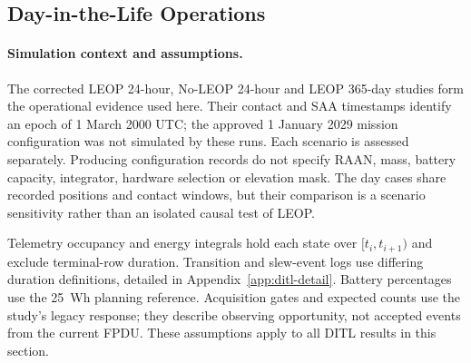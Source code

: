 \subsection{Day-in-the-Life Operations}\label{sec:sim-leop}
\paragraph{Simulation context and assumptions.} The corrected LEOP 24-hour, No-LEOP 24-hour and LEOP 365-day studies form the operational evidence used here. Their contact and SAA timestamps identify an epoch of 1 March 2000 UTC; the approved 1 January 2029 mission configuration was not simulated by these runs. Each scenario is assessed separately. Producing configuration records do not specify RAAN, mass, battery capacity, integrator, hardware selection or elevation mask. The day cases share recorded positions and contact windows, but their comparison is a scenario sensitivity rather than an isolated causal test of LEOP.

Telemetry occupancy and energy integrals hold each state over $[t_i,t_{i+1})$ and exclude terminal-row duration. Transition and slew-event logs use differing duration definitions, detailed in Appendix~\ref{app:ditl-detail}. Battery percentages use the 25~Wh planning reference. Acquisition gates and expected counts use the study's legacy response; they describe observing opportunity, not accepted events from the current FPDU. These assumptions apply to all DITL results in this section.

